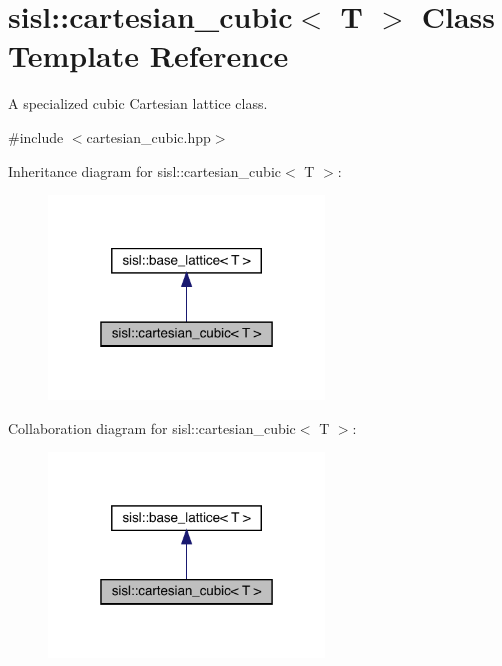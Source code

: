 \hypertarget{classsisl_1_1cartesian__cubic}{}\section{sisl\+:\+:cartesian\+\_\+cubic$<$ T $>$ Class Template Reference}
\label{classsisl_1_1cartesian__cubic}


A specialized cubic Cartesian lattice class.  




{\ttfamily \#include $<$cartesian\+\_\+cubic.\+hpp$>$}



Inheritance diagram for sisl\+:\+:cartesian\+\_\+cubic$<$ T $>$\+:\nopagebreak
\begin{figure}[H]
\begin{center}
\leavevmode
\includegraphics[width=208pt]{classsisl_1_1cartesian__cubic__inherit__graph}
\end{center}
\end{figure}


Collaboration diagram for sisl\+:\+:cartesian\+\_\+cubic$<$ T $>$\+:\nopagebreak
\begin{figure}[H]
\begin{center}
\leavevmode
\includegraphics[width=208pt]{classsisl_1_1cartesian__cubic__coll__graph}
\end{center}
\end{figure}
